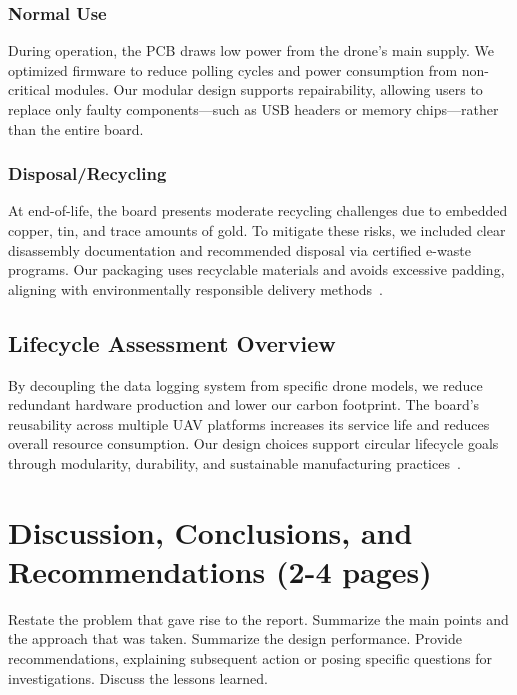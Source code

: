 \documentclass[12pt]{article}
\begin{document}
\subsubsection{Normal Use}

During operation, the PCB draws low power from the drone’s main supply. We optimized firmware to reduce polling cycles and power consumption from non-critical modules. Our modular design supports repairability, allowing users to replace only faulty components—such as USB headers or memory chips—rather than the entire board.

\subsubsection{Disposal/Recycling}

At end-of-life, the board presents moderate recycling challenges due to embedded copper, tin, and trace amounts of gold. To mitigate these risks, we included clear disassembly documentation and recommended disposal via certified e-waste programs. Our packaging uses recyclable materials and avoids excessive padding, aligning with environmentally responsible delivery methods~\cite{epa2023}.

\subsection{Lifecycle Assessment Overview}

By decoupling the data logging system from specific drone models, we reduce redundant hardware production and lower our carbon footprint. The board’s reusability across multiple UAV platforms increases its service life and reduces overall resource consumption. Our design choices support circular lifecycle goals through modularity, durability, and sustainable manufacturing practices~\cite{epa2023}.
\section{Discussion, Conclusions, and Recommendations (2-4 pages)}
Restate the problem that gave rise to the report. Summarize the main points and the approach that was taken. Summarize the design performance. Provide recommendations, explaining subsequent action or posing specific questions for investigations. Discuss the lessons learned.
\end{document}
